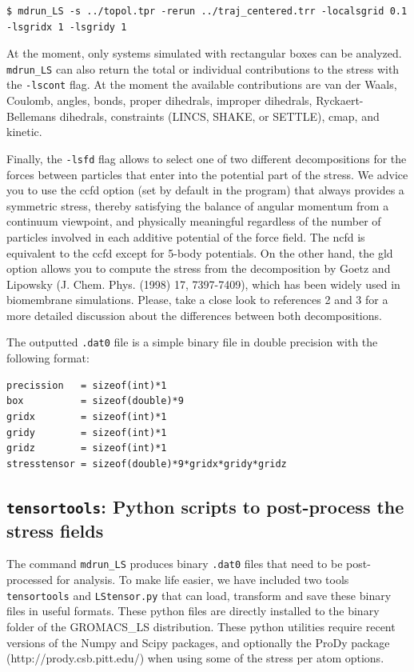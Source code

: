 \documentclass[10pt,letterpaper,notitlepage]{article}
\begin{document}
\begin{lstlisting}[caption=Setting the grid size]
$ mdrun_LS -s ../topol.tpr -rerun ../traj_centered.trr -localsgrid 0.1 -lsgridx 1 -lsgridy 1
\end{lstlisting}
At the moment, only systems simulated with rectangular boxes can be analyzed. \texttt{mdrun\_LS} can also return the total or individual contributions to the stress with the \texttt{-lscont} flag. At the moment the available contributions are van der Waals, Coulomb, angles, bonds, proper dihedrals, improper dihedrals, Ryckaert-Bellemans dihedrals, constraints (LINCS, SHAKE, or SETTLE), cmap, and kinetic. 

Finally, the \texttt{-lsfd} flag allows to select one of two different decompositions for the forces between particles that enter into the potential part of the stress. We advice you to use the ccfd option (set by default in the program) that always provides a symmetric stress, thereby satisfying the balance of angular momentum from a continuum viewpoint, and physically meaningful regardless of the number of particles involved in each additive potential of the force field. The ncfd is equivalent to the ccfd except for 5-body potentials. On the other hand, the gld option allows you to compute the stress from the decomposition by Goetz and Lipowsky (J. Chem. Phys. (1998) 17, 7397-7409), which has been widely used in biomembrane simulations. Please, take a close look to references 2 and 3 for a more detailed discussion about the differences between both decompositions.


The outputted \texttt{.dat0} file is a simple binary file in double precision with the following format:
\begin{lstlisting}[caption=Format of the \texttt{.dat0} binary file]
precission   = sizeof(int)*1
box          = sizeof(double)*9
gridx        = sizeof(int)*1
gridy        = sizeof(int)*1
gridz        = sizeof(int)*1
stresstensor = sizeof(double)*9*gridx*gridy*gridz
\end{lstlisting}

\subsection{\texttt{tensortools}: Python scripts to post-process the stress fields \label{postprocess}}

The command \texttt{mdrun\_LS} produces binary \texttt{.dat0} files that need to be post-processed for analysis. To make life easier, we have included two tools \texttt{tensortools} and \texttt{LStensor.py} that can load, transform and save these binary files in useful formats. These python files are directly installed to the binary folder of the GROMACS\_LS distribution. These python utilities require recent versions of the Numpy and Scipy packages, and optionally the ProDy package (http://prody.csb.pitt.edu/) when using some of the stress per atom options.
\end{document}
